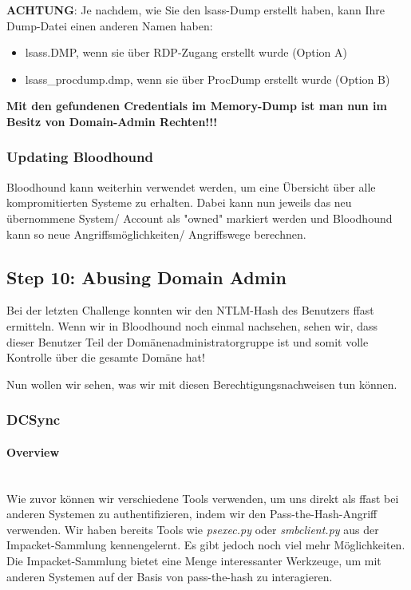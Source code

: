 \textbf{ACHTUNG}: Je nachdem, wie Sie den lsass-Dump erstellt haben, kann Ihre Dump-Datei einen anderen Namen haben:\\
\begin{itemize}
    \item lsass.DMP, wenn sie über RDP-Zugang erstellt wurde (Option A)
    \item lsass\_procdump.dmp, wenn sie über ProcDump erstellt wurde (Option B)\\
\end{itemize} 

\textcolor{OSTPink}{\textbf{Mit den gefundenen Credentials im Memory-Dump ist man nun im Besitz von Domain-Admin Rechten!!!}}

\subsubsection{Updating Bloodhound}
Bloodhound kann weiterhin verwendet werden, um eine Übersicht über alle kompromitierten Systeme zu erhalten. Dabei kann nun jeweils das neu übernommene System/ Account als "owned" markiert werden und Bloodhound kann so neue Angriffsmöglichkeiten/ Angriffswege berechnen.

\subsection{Step 10: Abusing Domain Admin}
Bei der letzten Challenge konnten wir den NTLM-Hash des Benutzers ffast ermitteln. Wenn wir in Bloodhound noch einmal nachsehen, sehen wir, dass dieser Benutzer Teil der Domänenadministratorgruppe ist und somit volle Kontrolle über die gesamte Domäne hat!

Nun wollen wir sehen, was wir mit diesen Berechtigungsnachweisen tun können.

\subsubsection{DCSync}

\paragraph{Overview}\mbox{} \\
Wie zuvor können wir verschiedene Tools verwenden, um uns direkt als ffast bei anderen Systemen zu authentifizieren, indem wir den Pass-the-Hash-Angriff verwenden. Wir haben bereits Tools wie \textcolor{OSTPink}{\textit{psexec.py}} oder \textcolor{OSTPink}{\textit{smbclient.py}} aus der Impacket-Sammlung kennengelernt.
Es gibt jedoch noch viel mehr Möglichkeiten. Die Impacket-Sammlung bietet eine Menge interessanter Werkzeuge, um mit anderen Systemen auf der Basis von pass-the-hash zu interagieren.

